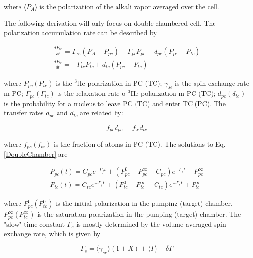 where $\langle P_{A}\rangle$ is the polarization of the alkali vapor averaged over the cell.

The following derivation will only focus on double-chambered cell. The polarization accumulation rate can be described by 

\begin{subequations}\label{DoubleChamber}
	\begin{gather}
	\frac{dP_{pc}}{dt}=\Gamma_{se}(P_{A}-P_{pc})-\Gamma_{pc}P_{pc}-d_{pc}(P_{pc}-P_{tc})\\
	\frac{dP_{tc}}{dt}=-\Gamma_{tc}P_{tc}+d_{tc}(P_{pc}-P_{tc})
	\end{gather}
\end{subequations}

where $P_{pc} (P_{tc})$ is the $^{3}$He polarization in PC (TC); $\gamma_{se}$ is the spin-exchange rate in PC; $\Gamma_{pc} (\Gamma_{tc})$  is the relaxation rate o $^{3}$He polarization in PC (TC); $d_{pc} (d_{tc})$ is the probability for a nucleus to leave PC (TC) and enter TC (PC). The transfer rates $d_{pc}$ and $d_{tc}$ are related by:

\begin{equation}
f_{pc}d_{pc}=f_{tc}d_{tc}
\end{equation}

where $f_{pc} (f_{tc})$ is the fraction of atoms in PC (TC). The solutions to Eq.\ref{DoubleChamber} are

\begin{subequations}\label{DoubleChamberSolution}
	\begin{gather}
	P_{pc}(t)=C_{pc}e^{-\Gamma_{f}t}+(P_{pc}^{0}-P_{pc}^{\infty}-C_{pc})e^{-\Gamma_{s}t}+P_{pc}^{\infty}\\
	P_{tc}(t)=C_{tc}e^{-\Gamma_{f}t}+(P_{tc}^{0}-P_{tc}^{\infty}-C_{tc})e^{-\Gamma_{s}t}+P_{tc}^{\infty}
	\end{gather}
\end{subequations}

where $P_{pc}^{0} (P_{tc}^{0})$ is the initial polarization in the pumping (target) chamber, $P_{pc}^{\infty} (P_{tc}^{\infty})$ is the saturation polarization in the pumping (target) chamber. The "slow" time constant $\Gamma_{s}$ is mostly determined by the volume averaged spin-exchange rate, which is given by

\begin{equation}
\Gamma_{s}=\langle \gamma_{se}\rangle(1+X)+\langle\Gamma\rangle-\delta\Gamma
\end{equation}

